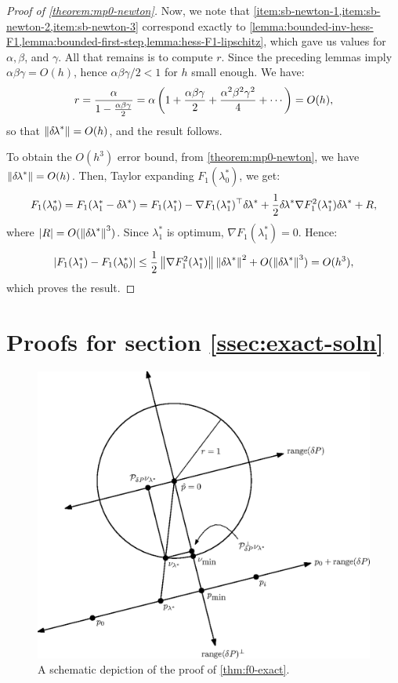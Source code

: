\documentclass{article}
\begin{document}
\begin{proof}[Proof of \cref{theorem:mp0-newton}]
  Now, we note that
  \cref{item:sb-newton-1,item:sb-newton-2,item:sb-newton-3} correspond
  exactly to
  \cref{lemma:bounded-inv-hess-F1,lemma:bounded-first-step,lemma:hess-F1-lipschitz},
  which gave us values for $\alpha, \beta$, and $\gamma$. All that
  remains is to compute $r$. Since the preceding lemmas imply
  $\alpha\beta\gamma = O(h)$, hence $\alpha\beta\gamma/2 < 1$ for $h$
  small enough. We have:
  \begin{equation}
    r = \frac{\alpha}{1 - \frac{\alpha\beta\gamma}{2}} = \alpha \left(1 + \frac{\alpha\beta\gamma}{2} + \frac{\alpha^2\beta^2\gamma^2}{4} + \cdots\right) = O(h),
  \end{equation}
  so that $\left\|{\delta \hspace{-0.1em} \lambda}^*\right\| = O(h)$, and the result follows.

  To obtain the $O(h^3)$ error bound, from \cref{theorem:mp0-newton},
  we have $\left\|{\delta \hspace{-0.1em} \lambda}^*\right\| = O(h)$. Then, Taylor expanding
  $F_1(\lambda_0^*)$, we get:
  \begin{equation*}
    F_1(\lambda_0^*)
    = F_1(\lambda_1^* - {\delta \hspace{-0.1em} \lambda}^*) = F_1(\lambda_1^*) - \nabla F_1(\lambda_1^*)^\top {\delta \hspace{-0.1em} \lambda}^* + \frac{1}{2} {\delta \hspace{-0.1em} \lambda}^* \nabla F_1^2(\lambda_1^*) {\delta \hspace{-0.1em} \lambda}^* + R,
  \end{equation*}
  where $\left|R\right| = O(\left\|{\delta \hspace{-0.1em} \lambda}^*\right\|^3)$. Since $\lambda_1^*$
  is optimum, $\nabla F_1(\lambda_1^*) = 0$. Hence:
  \begin{equation*}
    \left|F_1(\lambda_1^*) - F_1(\lambda_0^*)\right| \leq \frac{1}{2} \left\|\nabla F_1^2(\lambda_1^*)\right\| \left\|{\delta \hspace{-0.1em} \lambda}^*\right\|^2 + O(\left\|{\delta \hspace{-0.1em} \lambda}^*\right\|^3) = O(h^3),
  \end{equation*}
  which proves the result.
\end{proof}

\section{Proofs for section
  \ref{ssec:exact-soln}}\label{sec:exact-soln-proofs}

\begin{figure}
  \centering \includegraphics[width=0.9\linewidth]{f0-exact.eps}
  \caption{A schematic depiction of the proof of
    \cref{thm:f0-exact}.}\label{fig:f0-exact}
\end{figure}
\end{document}
